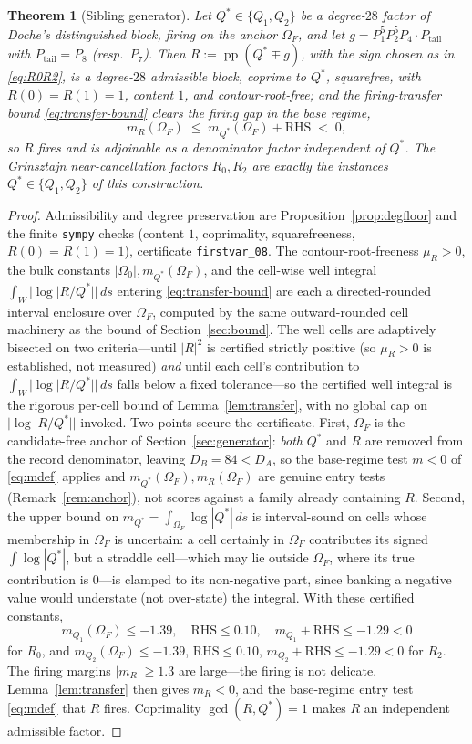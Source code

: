 \documentclass[11pt,reqno]{amsart}
\theoremstyle{plain}
\newtheorem{theorem}{Theorem}
\theoremstyle{definition}
\theoremstyle{remark}
\newcommand{\dA}{D_A}
\newcommand{\dB}{D_B}
\DeclareMathOperator{\pp}{pp}
\begin{document}
\begin{theorem}[Sibling generator]\label{thm:generator}
Let $Q^*\in\{Q_1,Q_2\}$ be a degree-$28$ factor of Doche's distinguished block, firing
on the anchor $\Omega_F$, and let $g=P_1^5P_2^5P_4\cdot P_{\mathrm{tail}}$ with
$P_{\mathrm{tail}}=P_8$ (resp.\ $P_7$). Then $R:=\pp(Q^*\mp g)$, with the sign chosen as
in \eqref{eq:R0R2}, is a degree-$28$ admissible block, coprime to $Q^*$, squarefree,
with $R(0)=R(1)=1$, content $1$, and contour-root-free; and the firing-transfer bound
\eqref{eq:transfer-bound} clears the firing gap in the base regime,
\[
  m_R(\Omega_F)\;\le\;m_{Q^*}(\Omega_F)+\mathrm{RHS}\;<\;0 ,
\]
so $R$ fires and is adjoinable as a denominator factor independent of $Q^*$. The
Grinsztajn near-cancellation factors $R_0,R_2$ are exactly the instances
$Q^*\in\{Q_1,Q_2\}$ of this construction.
\end{theorem}

\begin{proof}
Admissibility and degree preservation are Proposition~\ref{prop:degfloor} and the
finite \texttt{sympy} checks (content $1$, coprimality, squarefreeness, $R(0)=R(1)=1$),
certificate \texttt{firstvar\_08}. The contour-root-freeness $\mu_R>0$, the bulk
constants $|\Omega_0|,m_{Q^*}(\Omega_F)$, and the cell-wise well integral
$\int_W|\log|R/Q^*||\,ds$ entering \eqref{eq:transfer-bound} are each a directed-rounded
interval enclosure over $\Omega_F$, computed by the same outward-rounded cell machinery
as the bound of Section~\ref{sec:bound}. The well cells are adaptively bisected on two
criteria---until $|R|^2$ is certified strictly positive (so $\mu_R>0$ is established, not
measured) \emph{and} until each cell's contribution to $\int_W|\log|R/Q^*||\,ds$ falls
below a fixed tolerance---so the certified well integral is the rigorous per-cell bound
of Lemma~\ref{lem:transfer}, with no global cap on $|\log|R/Q^*||$ invoked. Two points
secure the certificate. First, $\Omega_F$ is the candidate-free anchor of
Section~\ref{sec:generator}: \emph{both} $Q^*$ and $R$ are removed from the record
denominator, leaving $\dB=84<\dA$, so the base-regime test $m<0$ of \eqref{eq:mdef}
applies and $m_{Q^*}(\Omega_F),m_R(\Omega_F)$ are genuine entry tests
(Remark~\ref{rem:anchor}), not scores against a family already containing $R$. Second,
the upper bound on $m_{Q^*}=\int_{\Omega_F}\log|Q^*|\,ds$ is interval-sound on cells
whose membership in $\Omega_F$ is uncertain: a cell certainly in $\Omega_F$ contributes
its signed $\int\log|Q^*|$, but a straddle cell---which may lie outside $\Omega_F$, where
its true contribution is $0$---is clamped to its non-negative part, since banking a
negative value would understate (not over-state) the integral. With these
certified constants,
\[
  m_{Q_1}(\Omega_F)\le-1.39,\quad \mathrm{RHS}\le0.10,\quad
  m_{Q_1}+\mathrm{RHS}\le-1.29<0
\]
for $R_0$, and $m_{Q_2}(\Omega_F)\le-1.39$, $\mathrm{RHS}\le0.10$,
$m_{Q_2}+\mathrm{RHS}\le-1.29<0$ for $R_2$. The firing margins $|m_R|\ge1.3$ are
large---the firing is not delicate. Lemma~\ref{lem:transfer} then gives $m_R<0$, and the
base-regime entry test \eqref{eq:mdef} that $R$ fires. Coprimality $\gcd(R,Q^*)=1$ makes
$R$ an independent admissible factor.
\end{proof}
\end{document}
